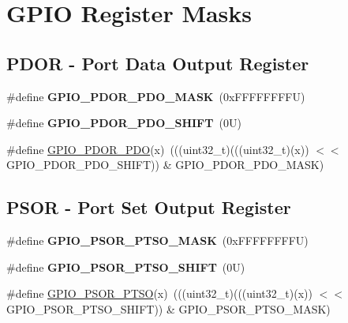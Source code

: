 \hypertarget{group___g_p_i_o___register___masks}{}\section{G\+P\+IO Register Masks}
\label{group___g_p_i_o___register___masks}
\subsection*{P\+D\+OR -\/ Port Data Output Register}
\begin{DoxyCompactItemize}
\item 
\mbox{\label{group___f_g_p_i_o___register___masks_gafd2a8274691295293b3cabfe86089801}} 
\#define {\bfseries G\+P\+I\+O\+\_\+\+P\+D\+O\+R\+\_\+\+P\+D\+O\+\_\+\+M\+A\+SK}~(0x\+F\+F\+F\+F\+F\+F\+F\+F\+U)
\item 
\mbox{\label{group___f_g_p_i_o___register___masks_ga495b5f1e63de863534ce0c5f25f137ab}} 
\#define {\bfseries G\+P\+I\+O\+\_\+\+P\+D\+O\+R\+\_\+\+P\+D\+O\+\_\+\+S\+H\+I\+FT}~(0\+U)
\item 
\#define \mbox{\hyperlink{group___f_g_p_i_o___register___masks_ga4071beeff4d9b5c200686972dd52d855}{G\+P\+I\+O\+\_\+\+P\+D\+O\+R\+\_\+\+P\+DO}}(x)~(((uint32\+\_\+t)(((uint32\+\_\+t)(x)) $<$$<$ G\+P\+I\+O\+\_\+\+P\+D\+O\+R\+\_\+\+P\+D\+O\+\_\+\+S\+H\+I\+FT)) \& G\+P\+I\+O\+\_\+\+P\+D\+O\+R\+\_\+\+P\+D\+O\+\_\+\+M\+A\+SK)
\end{DoxyCompactItemize}
\subsection*{P\+S\+OR -\/ Port Set Output Register}
\begin{DoxyCompactItemize}
\item 
\mbox{\label{group___f_g_p_i_o___register___masks_gaa8a48e38ef70ff1ba3bbcbf31b891da4}} 
\#define {\bfseries G\+P\+I\+O\+\_\+\+P\+S\+O\+R\+\_\+\+P\+T\+S\+O\+\_\+\+M\+A\+SK}~(0x\+F\+F\+F\+F\+F\+F\+F\+F\+U)
\item 
\mbox{\label{group___f_g_p_i_o___register___masks_ga5a962b85e07477e26afe639c7ca478cb}} 
\#define {\bfseries G\+P\+I\+O\+\_\+\+P\+S\+O\+R\+\_\+\+P\+T\+S\+O\+\_\+\+S\+H\+I\+FT}~(0\+U)
\item 
\#define \mbox{\hyperlink{group___f_g_p_i_o___register___masks_ga6b16f5841a5c5f20311eafc574f814e4}{G\+P\+I\+O\+\_\+\+P\+S\+O\+R\+\_\+\+P\+T\+SO}}(x)~(((uint32\+\_\+t)(((uint32\+\_\+t)(x)) $<$$<$ G\+P\+I\+O\+\_\+\+P\+S\+O\+R\+\_\+\+P\+T\+S\+O\+\_\+\+S\+H\+I\+FT)) \& G\+P\+I\+O\+\_\+\+P\+S\+O\+R\+\_\+\+P\+T\+S\+O\+\_\+\+M\+A\+SK)
\end{DoxyCompactItemize}
